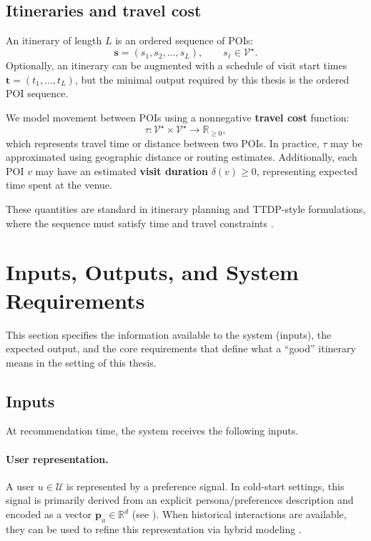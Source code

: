\subsection{Itineraries and travel cost}
An itinerary of length $L$ is an ordered sequence of POIs:
\[
\mathbf{s} = (s_1, s_2, \dots, s_L), \qquad s_{\ell} \in \mathcal{V}^{\star}.
\]
Optionally, an itinerary can be augmented with a schedule of visit start times $\mathbf{t}=(t_1,\dots,t_L)$, but the minimal output required by this thesis is the ordered POI sequence.

We model movement between POIs using a nonnegative \textbf{travel cost} function:
\[
\tau: \mathcal{V}^{\star} \times \mathcal{V}^{\star} \rightarrow \mathbb{R}_{\ge 0},
\]
which represents travel time or distance between two POIs. In practice, $\tau$ may be approximated using geographic distance or routing estimates. Additionally, each POI $v$ may have an estimated \textbf{visit duration} $\delta(v) \ge 0$, representing expected time spent at the venue.

These quantities are standard in itinerary planning and TTDP-style formulations, where the sequence must satisfy time and travel constraints \citep{gavalas2014ttdp}.

\section{Inputs, Outputs, and System Requirements}
\label{sec:prob-io}

This section specifies the information available to the system (inputs), the expected output, and the core requirements that define what a ``good'' itinerary means in the setting of this thesis.

\subsection{Inputs}
At recommendation time, the system receives the following inputs.

\paragraph{User representation.}
A user $u \in \mathcal{U}$ is represented by a preference signal. In cold-start settings, this signal is primarily derived from an explicit persona/preferences description and encoded as a vector $\mathbf{p}_u \in \mathbb{R}^d$ (see ). When historical interactions are available, they can be used to refine this representation via hybrid modeling \citep{burke2002hybrid}.

